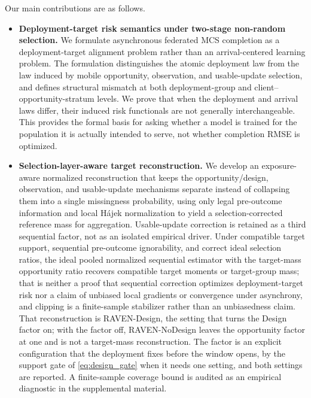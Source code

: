 \documentclass[letterpaper,journal]{IEEEtran}
\begin{document}
Our main contributions are as follows.

\begin{itemize}
    \item \textbf{Deployment-target risk semantics under two-stage non-random
    selection.}
    We formulate asynchronous federated MCS completion as a
    deployment-target alignment problem rather than an arrival-centered
    learning problem.  The formulation distinguishes the atomic deployment law
    from the law induced by mobile opportunity, observation, and usable-update
    selection, and defines structural mismatch at both deployment-group and
    client--opportunity-stratum levels.  We prove that when the deployment and
    arrival laws differ, their induced risk functionals are not generally
    interchangeable.  This provides the formal basis for asking whether a model
    is trained for the population it is actually intended to serve, not whether
    completion RMSE is optimized.

    \item \textbf{Selection-layer-aware target reconstruction.}
    We develop an exposure-aware normalized reconstruction that keeps the
    opportunity/design, observation, and usable-update mechanisms separate
    instead of collapsing them into a single missingness probability, using only
    legal pre-outcome information and local H\'ajek normalization to yield a
    selection-corrected reference mass for aggregation.  Usable-update correction
    is retained as a third sequential factor, not as an isolated empirical
    driver.  Under compatible target support, sequential pre-outcome
    ignorability, and correct ideal selection ratios, the ideal pooled normalized
    sequential estimator with the target-mass opportunity ratio recovers
    compatible target moments or target-group mass; that is neither a proof that
    sequential correction optimizes deployment-target risk nor a claim of
    unbiased local gradients or convergence under asynchrony, and clipping is a
    finite-sample stabilizer rather than an unbiasedness claim.  That
    reconstruction is RAVEN-Design, the setting that turns the Design factor on;
    with the factor off, RAVEN-NoDesign leaves the opportunity factor at one and
    is not a target-mass reconstruction.  The factor is an explicit
    configuration that the deployment fixes before the window opens, by the
    support gate of \eqref{eq:design_gate} when it needs one setting, and both
    settings are reported.  A finite-sample coverage bound is audited as an
    empirical diagnostic in the supplemental material.


\end{itemize}
\end{document}
